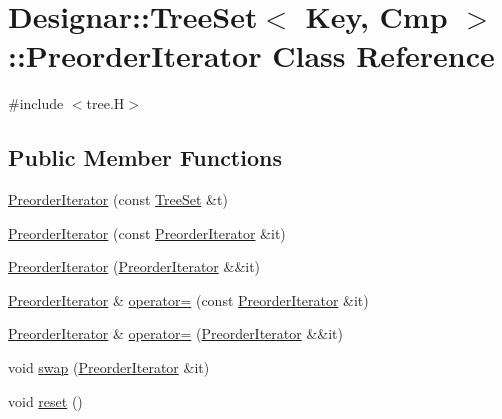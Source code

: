 \hypertarget{class_designar_1_1_tree_set_1_1_preorder_iterator}{}\section{Designar\+:\+:Tree\+Set$<$ Key, Cmp $>$\+:\+:Preorder\+Iterator Class Reference}
\label{class_designar_1_1_tree_set_1_1_preorder_iterator}


{\ttfamily \#include $<$tree.\+H$>$}

\subsection*{Public Member Functions}
\begin{DoxyCompactItemize}
\item 
\hyperlink{class_designar_1_1_tree_set_1_1_preorder_iterator_adc001b3f3f4d1783b3c0100573c78e82}{Preorder\+Iterator} (const \hyperlink{class_designar_1_1_tree_set}{Tree\+Set} \&t)
\item 
\hyperlink{class_designar_1_1_tree_set_1_1_preorder_iterator_a248d1432d0076b5e906eba1105b8cafe}{Preorder\+Iterator} (const \hyperlink{class_designar_1_1_tree_set_1_1_preorder_iterator}{Preorder\+Iterator} \&it)
\item 
\hyperlink{class_designar_1_1_tree_set_1_1_preorder_iterator_a150416f170b753cea35af2a97c273850}{Preorder\+Iterator} (\hyperlink{class_designar_1_1_tree_set_1_1_preorder_iterator}{Preorder\+Iterator} \&\&it)
\item 
\hyperlink{class_designar_1_1_tree_set_1_1_preorder_iterator}{Preorder\+Iterator} \& \hyperlink{class_designar_1_1_tree_set_1_1_preorder_iterator_a363ca040cb12714989c19775d68d5f88}{operator=} (const \hyperlink{class_designar_1_1_tree_set_1_1_preorder_iterator}{Preorder\+Iterator} \&it)
\item 
\hyperlink{class_designar_1_1_tree_set_1_1_preorder_iterator}{Preorder\+Iterator} \& \hyperlink{class_designar_1_1_tree_set_1_1_preorder_iterator_a4529fb706d5adfe1b90adfb44b88ffd2}{operator=} (\hyperlink{class_designar_1_1_tree_set_1_1_preorder_iterator}{Preorder\+Iterator} \&\&it)
\item 
void \hyperlink{class_designar_1_1_tree_set_1_1_preorder_iterator_ad73821de15e9066c6559a0d99bd9a8a6}{swap} (\hyperlink{class_designar_1_1_tree_set_1_1_preorder_iterator}{Preorder\+Iterator} \&it)
\item 
void \hyperlink{class_designar_1_1_tree_set_1_1_preorder_iterator_a0f3df9413ded80888e75706e65c919b0}{reset} ()

\end{DoxyCompactItemize}
